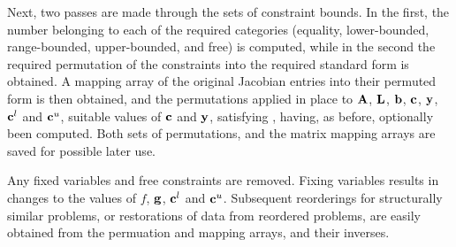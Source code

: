 \documentclass{galahad}
\begin{document}
Next, two passes are made through the sets of constraint bounds. 
In the first, the number belonging to each of the required categories 
(equality, lower-bounded, range-bounded, 
upper-bounded, and free) is computed, while in the 
second the required permutation of the constraints 
into the required standard form is obtained. 
A mapping array of the original Jacobian entries into their 
permuted form is then obtained, and the permutations applied in place 
to ${\mathbf{A}}$, ${\mathbf{L}}$, ${\mathbf{b}}$, ${\mathbf{c}}$, ${\mathbf{y}}$, ${\mathbf{c}}^l$ and ${\mathbf{c}}^u$, 
suitable values of ${\mathbf{c}}$ and ${\mathbf{y}}$, satisfying ,
having, as before, optionally been computed. 
Both sets of permutations, and the matrix mapping arrays are saved for 
possible later use. 
 
Any fixed variables and free constraints are removed. Fixing variables 
results in changes to the values of $f$, ${\mathbf{g}}$, ${\mathbf{c}}^l$ and ${\mathbf{c}}^u$. 
Subsequent reorderings for structurally similar problems, or restorations 
of data from reordered problems, 
are easily obtained from the permuation and mapping arrays, and their inverses. 

\end{document}
